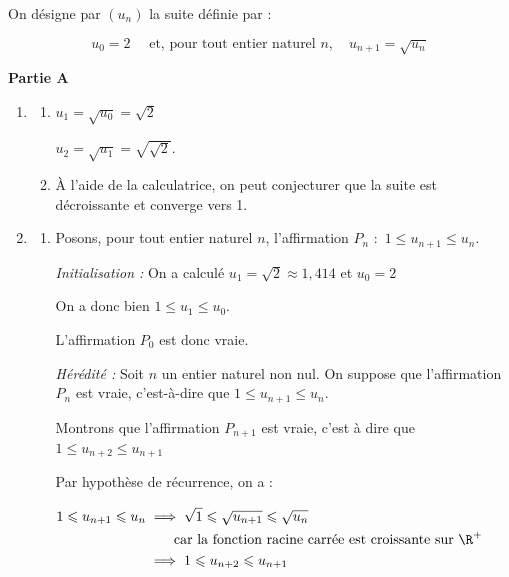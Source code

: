 
%
%

On désigne par $\left(u_{n}\right)$ la suite définie par :

\[u_{0}=2 \quad \text { et, pour tout entier naturel } n,\quad  u_{n+1}=\sqrt{u_{n}}\]

\medskip

\textbf{Partie A}

\medskip

\begin{enumerate}
\item
	\begin{enumerate}
		\item %

$u_1=\sqrt{u_0}=\sqrt{2}$

$u_2=\sqrt{u_1} =\sqrt{\sqrt{2}}$.
		\item À l'aide de la calculatrice, on peut conjecturer que la suite est décroissante et converge vers 1.
	\end{enumerate}
\item
	\begin{enumerate}
		\item Posons, pour tout entier naturel $n$, l'affirmation $P_n$ :~\og $1 \leqslant u_{n+1} \leqslant u_{n}$\fg{}.\hfill

\emph{Initialisation :} On a calculé $u_1 = \sqrt{2} \approx 1,414$ et $u_0=2$

On a donc bien $1 \leqslant u_1 \leqslant u_0$.

L'affirmation $P_0$ est donc vraie.

\emph{Hérédité :} Soit $n$ un entier naturel non nul. On suppose que l'affirmation $P_n$ est vraie, c'est-à-dire que $1 \leqslant u_{n+1} \leqslant u_{n}$.

Montrons que l'affirmation $P_{n+1}$ est vraie, c'est à dire que $1 \leqslant u_{n+2} \leqslant u_{n+1}$

Par hypothèse de récurrence, on a :

$ \begin{aligned}[t]
1 \leqslant u_{n+1} \leqslant u_n
	&\implies \sqrt{1} \leqslant \sqrt{u_{n+1}} \leqslant \sqrt{u_n}\\
	&\qquad \text{car  la fonction racine carrée est croissante sur } \R^+ \\
	&\implies 1 \leqslant u_{n+2} \leqslant u_{n+1}
\end{aligned}$


\end{enumerate}
\end{enumerate}

